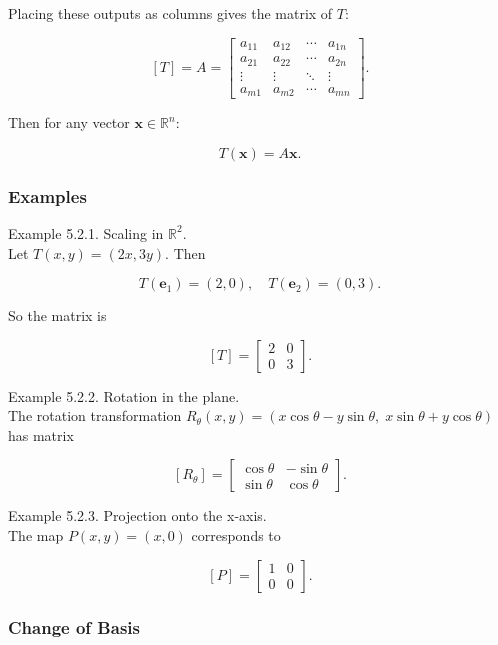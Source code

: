 \documentclass[
  12pt,
  a4paper,
]{article}
\begin{document}
Placing these outputs as columns gives the matrix of \(T\):

\[[T] = A = \begin{bmatrix}
a_{11} & a_{12} & \cdots & a_{1n} \\
a_{21} & a_{22} & \cdots & a_{2n} \\
\vdots & \vdots & \ddots & \vdots \\
a_{m1} & a_{m2} & \cdots & a_{mn}
\end{bmatrix}.\]

Then for any vector \(\mathbf{x} \in \mathbb{R}^n\):

\[T(\mathbf{x}) = A\mathbf{x}.\]

\subsubsection{Examples}\label{examples-5}

Example 5.2.1. Scaling in \(\mathbb{R}^2\).\\
Let \(T(x,y) = (2x, 3y)\). Then

\[T(\mathbf{e}_1) = (2,0), \quad T(\mathbf{e}_2) = (0,3).\]

So the matrix is

\[[T] = \begin{bmatrix}
2 & 0 \\
0 & 3
\end{bmatrix}.\]

Example 5.2.2. Rotation in the plane.\\
The rotation transformation
\(R_\theta(x,y) = (x\cos\theta - y\sin\theta, \; x\sin\theta + y\cos\theta)\)
has matrix

\[[R_\theta] = \begin{bmatrix}
\cos\theta & -\sin\theta \\
\sin\theta & \cos\theta
\end{bmatrix}.\]

Example 5.2.3. Projection onto the x-axis.\\
The map \(P(x,y) = (x,0)\) corresponds to

\[[P] = \begin{bmatrix}
1 & 0 \\
0 & 0
\end{bmatrix}.\]

\subsubsection{Change of Basis}\label{change-of-basis-2}
\end{document}
